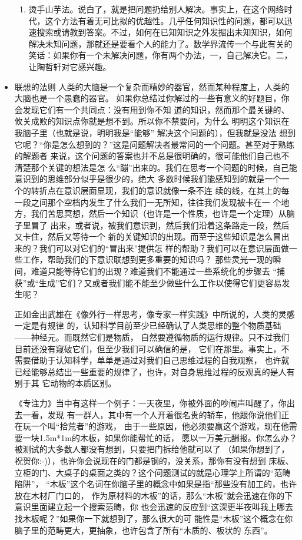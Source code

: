 \documentclass[11pt]{article}
\begin{document}
\begin{itemize}
\begin{enumerate}
\item 烫手山芋法。说白了，就是把问题扔给别人解决。事实上，在这个网络时代，这个方法有着无可比拟的优越性。几乎任何知识性的问题，都可以迅速搜索或请教到答案。不过，如何在已知知识之外发掘出未知知识，如何解决未知问题，那就还是要看个人的能力了。数学界流传一个与此有关的笑话：如果你有一个未解决问题，你有两个办法，一，自己解决它。二，让陶哲轩对它感兴趣。
\end{enumerate}
\item 联想的法则
\label{sec:orgheadline201}
人类的大脑是一个复杂而精妙的器官，然而某种程度上，人类的大脑也是一个愚蠢的器官。
如果你总结过你解过的一些有意义的好题目，你会发现它们有一个共同点：没有用到你不知
道的知识，然而那个最关键的、攸关成败的知识点你就是想不到。所以你不禁要问，为什么
明明这个知识在我脑子里（也就是说，明明我是“能够” 解决这个问题的），但我就是没法
想到它呢？“你是怎么想到的？”这是问题解决者最常问的一个问题。甚至对于熟练的解题者
来说，这个问题的答案也并不总是很明确的，很可能他们自己也不清楚那个关键的想法是怎
么“蹦”出来的。我们在思考一个问题的时候，自己能意识到的思维部分似乎是很少的，绝大
多数时候我们能感知到的就是一个一个的转折点在意识层面显现，我们的意识就像一条不连
续的线，在其上的每一段之间那个空档内发生了什么我们一无所知，往往我们发现被卡在一
个地方，我们苦思冥想，然后一个知识（也许是一个性质，也许是一个定理）从脑子里冒了
出来，或者说，被我们意识到，然后我们沿着这条路走一段，然后又卡住，然后又等待一个
新的关键知识的出现。而至于这些知识是怎么冒出来的？我们可以对它们的“冒出来”提供怎
样的帮助？我们可以在意识层面做一些工作，帮助我们的下意识联想到更多重要的知识吗？
那些灵光一现的瞬间，难道只能等待它们的出现？难道我们不能通过一些系统化的步骤去
“捕获”或“生成”它们？又或者我们能不能至少做些什么工作以使得它们更容易发生呢？

正如金出武雄在《像外行一样思考，像专家一样实践》中所说的，人类的灵感一定是有规律
的，认知科学目前至少已经确认了人类思维的整个物质基础——神经元。而既然它们是物质，
自然要遵循物质的运行规律。只不过我们目前还没有窥破它们，但至少我们可以确信的是，
它们在那里。事实上，不需要借助于认知科学，单单是通过对我们自己思维过程的自我观察，
也许就已经能够总结出一些重要的规律了，也许，对自身思维过程的反观真的是人有别于其
它动物的本质区别。

《专注力》当中有这样一个例子：一天夜里，你被外面的吵闹声叫醒了，你出去一看，发现
有一群人，其中有一个人开着很名贵的轿车，他跟你说他们正在玩一个叫“拾荒者”的游戏，
由于一些原因，他必须要赢这个游戏，现在他需要一块1.5m*1m的木板，如果你能帮忙的话，
愿以一万美元酬报。你怎么办？被测试的大多数人都没有想到，只要把门拆给他就可以了
（如果你想到了，祝贺你:-)），也许你会说现在的门都是钢的，没关系，那你有没有想到
床板、立柜的门、大桌子的桌面之类的？这个问题测试的就是心理学上所谓的“范畴陷阱”，
“木板”这个名词在你脑子里的概念中如果是指“那些没有加工的，也许放在木材厂门口的，
作为原材料的木板”的话，那么“木板”就会迅速在你的下意识里面建立起一个搜索范畴，你
也会迅速的反应到“这深更半夜叫我上哪去找木板呢？”如果你一下就想到了，那么很大的可
能性是“木板”这个概念在你脑子里的范畴更大，更抽象，也许包含了所有“木质的、板状的
东西”。


\end{itemize}
\end{document}
